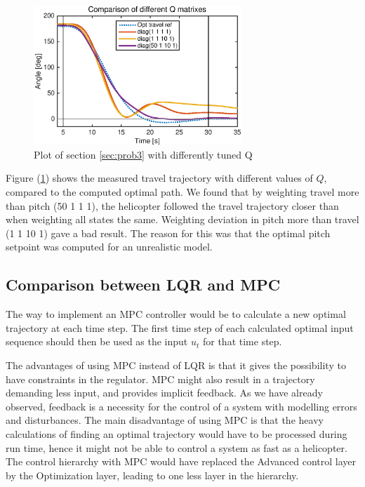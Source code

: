 \begin{figure}[htb]
    \centering
        \includegraphics[width=0.7\textwidth]{figures/day3/plot_day3_allQ}
    \caption{Plot of section \ref{sec:prob3} with differently tuned Q}
    \label{fig:day3_plot_allQ}
\end{figure}

Figure (\ref{fig:day3_plot_allQ}) shows the measured travel trajectory with different values of $Q$, compared to the computed optimal path. We found that by weighting travel more than pitch (50 1 1 1), the helicopter followed the travel trajectory closer than when weighting all states the same. Weighting deviation in pitch more than travel (1 1 10 1) gave a bad result. The reason for this was that the optimal pitch setpoint was computed for an unrealistic model.

\subsection{Comparison between LQR and MPC}
The way to implement an MPC controller would be to calculate a new optimal trajectory at each time step. The first time step of each calculated optimal input sequence should then be used as the input $u_t$ for that time step.

The advantages of using MPC instead of LQR is that it gives the possibility to have constraints in the regulator. MPC might also result in a trajectory demanding less input, and provides implicit feedback. As we have already observed, feedback is a necessity for the control of a system with modelling errors and disturbances.
The main disadvantage of using MPC is that the heavy calculations of finding an optimal trajectory would have to be processed during run time, hence it might not be able to control a system as fast as a helicopter.
The control hierarchy with MPC would have replaced the Advanced control layer by the Optimization layer, leading to one less layer in the hierarchy.
